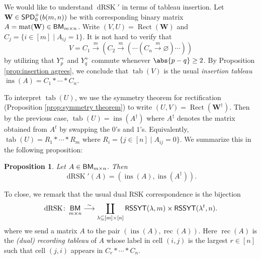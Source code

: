 \documentclass[11pt,reqno]{amsart} %
\newcommand{\bfW}{\mathbf{W}}
\newcommand{\sseq}{\subseteq}
\newcommand{\msert}{\overset{m}{\rightarrow}}
\DeclareMathOperator{\SPD}{\sf{SPD}}
\DeclareMathOperator{\RSSYT}{\sf{RSSYT}}
\DeclareMathOperator{\BM}{\sf{BM}}
\DeclareMathOperator{\RSK}{dRSK}
\DeclareMathOperator{\tab}{tab}
\DeclareMathOperator{\mat}{mat}
\DeclareMathOperator{\ins}{ins}
\DeclareMathOperator{\rec}{rec}
\DeclareMathOperator{\Rect}{Rect} %
\newtheorem{proposition}[theorem]{Proposition}
\theoremstyle{definition}
\begin{document}
We would like to understand $\RSK'$ in terms of tableau insertion.
Let $\bfW\in \SPD_0^+(b(m,n))$ be with corresponding binary matrix $A= \mat(\bfW)\in \BM_{m\times n}$.
Write $(V,U) = \Rect(\bfW)$ and $C_j = \{i\in [m] \mid A_{ij} = 1\}$.
It is not hard to verify that \[
    V = C_1\msert (C_2\msert(\cdots (C_n\msert \varnothing)\cdots))
\] by utilizing that $Y^+_p$ and $Y^+_q$ commute whenever $\abs{p-q}\geq 2$.
By Proposition \ref{prop:insertion agrees}, we conclude that $\tab(V)$ is the usual \textit{insertion tableau} $\ins(A) = C_1 * \cdots * C_n$.

To interpret $\tab(U)$, we use the symmetry theorem for rectification (Proposition \ref{prop:symmetry theorem}) to write $(U,V) = \Rect(\bfW^\dagger)$.
Then by the previous case, $\tab(U) = \ins(A^\dagger)$ where $A^\dagger$ denotes the matrix obtained from $A^t$ by swapping the $0$'s and $1$'s.
Equivalently, $\tab(U) = R_1 * \cdots * R_m$ where $R_i = \{j\in[n] \mid A_{ij} = 0\}$.
We summarize this in the following proposition:
\begin{proposition}
\label{prop:pipe dream dual RSK}
Let $A\in \BM_{m\times n}$.
Then \[
    \RSK'(A) = (\ins(A),\ins(A^\dagger)).
\]
\end{proposition}


To close, we remark that the usual dual RSK correspondence is the bijection \[
    \RSK\colon
    \BM_{m\times n}
    \overset\sim\longrightarrow
    \coprod_{\lambda\sseq [m]\times[n]}
    \RSSYT(\lambda,m) \times \RSSYT(\lambda^t,n).
\] where we send a matrix $A$ to the pair $(\ins(A),\rec(A))$.
Here $\rec(A)$ is the \textit{(dual) recording tableau} of $A$ whose label in cell $(i,j)$ is the largest $r\in [n]$ such that cell $(j,i)$ appears in $C_r * \cdots * C_n$.
\end{document}
